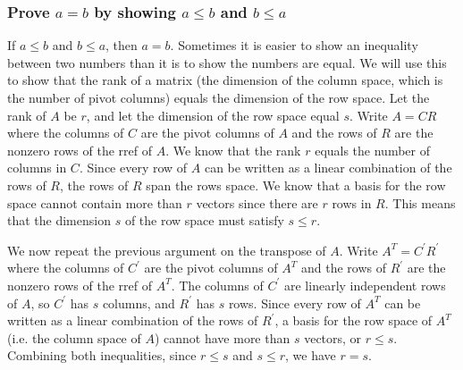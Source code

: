 \subsubsection{Prove $a=b$ by showing $a\leq b$ and $b\leq a$}
If $a\leq b$ and $b\leq a$, then $a=b$. 
Sometimes it is easier to show an inequality between two numbers than it is to show the numbers are equal.  
We will use this to show that the rank of a matrix (the dimension of the column space, which is the number of pivot columns) equals the dimension of the row space.
Let the rank of $A$ be $r$, and let the dimension of the row space equal $s$. 
Write $A=CR$ where the columns of $C$ are the pivot columns of $A$ and the rows of $R$ are the nonzero rows of the rref of $A$. 
We know that the rank $r$ equals the number of columns in $C$. 
Since every row of $A$ can be written as a linear combination of the rows of $R$, the rows of $R$ span the rows space. 
We know that a basis for the row space cannot contain more than $r$ vectors since there are $r$ rows in $R$. 
This means that the dimension $s$ of the row space must satisfy $s\leq r$.
 
We now repeat the previous argument on the transpose of $A$. Write $A^T = C^\prime R^\prime$ where the columns of $C^\prime$ are the pivot columns of $A^T$ and the rows of $R^\prime$ are the nonzero rows of the rref of $A^T$. The columns of $C^\prime$ are linearly independent rows of $A$, so $C^\prime$ has $s$ columns, and $R^\prime$ has $s$ rows. Since every row of $A^T$ can be written as a linear combination of the rows of $R^\prime$, a basis for the row space of $A^T$ (i.e. the column space of $A$) cannot have more than $s$ vectors, or $r\leq s$. Combining both inequalities, since $r\leq s$ and $s\leq r$, we have $r=s$.

